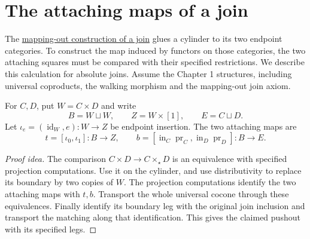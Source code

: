 \documentclass[11pt]{article}
\begin{document}
\section*{The attaching maps of a join}

The \href{joins.html}{mapping-out construction of a join} glues a cylinder
to its two endpoint categories. To construct the map induced by functors
on those categories, the two attaching squares must be compared with their
specified restrictions. We describe this calculation for absolute joins.
Assume the Chapter 1 structures, including universal coproducts, the walking
morphism and the mapping-out join axiom.

For $C,D$, put $W=C\times D$ and write
\[
 B=W\sqcup W,\qquad Z=W\times[1],\qquad E=C\sqcup D.
\]
Let $\iota_e=(\operatorname{id}_W,e)\colon W\to Z$ be endpoint insertion.
The two attaching maps are
\[
 t=[\iota_0,\iota_1]\colon B\to Z,\qquad
 b=[\operatorname{in}_C\operatorname{pr}_C,
       \operatorname{in}_D\operatorname{pr}_D]\colon B\to E.
\]

\begin{proof}[Proof idea]
The comparison $C\times D\to C\times_\star D$ is an equivalence with
specified projection computations. Use it on the cylinder, and use
distributivity to replace its boundary by two copies of $W$.
The projection computations identify the two attaching maps with $t,b$.
Transport the whole universal cocone through these equivalences.
Finally identify its boundary leg with the original join inclusion and
transport the matching along that identification. This gives the claimed
pushout with its specified legs.
\end{proof}
\end{document}
